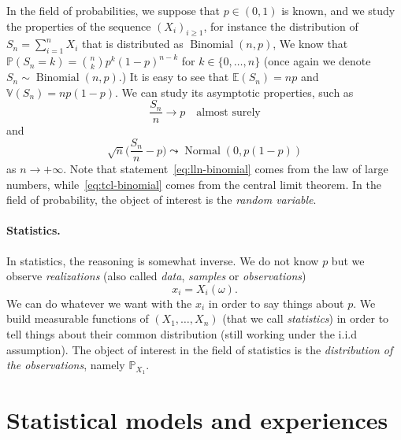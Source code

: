 \documentclass[
	fontsize=11pt, %
	twoside=false, %
	numbers=noenddot, %
]{kaobook}
\DeclareMathOperator{\nor}{Normal}
\DeclareMathOperator{\bin}{Binomial}
\renewcommand{\P}{\mathbb P}
\newcommand{\E}{\mathbb E}
\newcommand{\var}{\mathbb V}
\begin{document}
In the field of probabilities, we suppose that $p \in (0, 1)$ is known, and we study the properties of the sequence $(X_i)_{i \geq 1}$, for instance the distribution of $S_n = \sum_{i=1}^n X_i$ that is distributed as $\bin(n, p)$,  
We know that $\P(S_n = k) = \binom{n}{k} p^k (1 - p)^{n-k}$ for $k \in \{0, \ldots, n\}$ (once again we denote $S_n \sim \bin(n, p)$.)
It is easy to see that $\E(S_n) = np$ and $\var(S_n) = np (1 - p)$.
We can study its asymptotic properties, such as 
\begin{equation}
	\label{eq:lln-binomial}
	\frac{S_n}{n} \rightarrow p	\quad \text{almost surely}
\end{equation}
and
\begin{equation}
	\label{eq:tcl-binomial}
	\sqrt n \Big(\frac{S_n}{n} - p\Big) \leadsto \nor(0, p(1-p))
\end{equation}
as $n \rightarrow +\infty$.
Note that statement~\eqref{eq:lln-binomial} comes from the law of large numbers, while~\eqref{eq:tcl-binomial} comes from the central limit theorem.
In the field of probability, the object of interest is the \emph{random variable}.

\paragraph{Statistics.} %
\label{par:statistics}

In statistics, the reasoning is somewhat inverse. We do not know $p$ but we observe \emph{realizations} (also called \emph{data}, \emph{samples} or \emph{observations})
\begin{equation*}
	x_i = X_i(\omega).
\end{equation*}
We can do whatever we want with the $x_i$ in order to say things about $p$.
We build measurable functions of $(X_1, \ldots, X_n)$ (that we call \emph{statistics}) in order to tell things about their common distribution (still working under the i.i.d assumption).
The object of interest in the field of statistics is the \emph{distribution of the observations}, namely $\P_{X_1}$.


\section{Statistical models and experiences} %
\label{sec:statistical_models_and_experiences}
\end{document}
